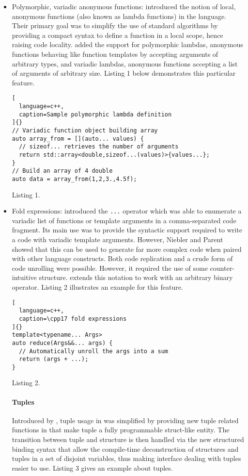 \documentclass[../../main.tex]{subfiles}
\begin{document}
\begin{itemize}
\item Polymorphic, variadic anonymous functions: 
introduced the notion of local, anonymous functions
(also known as lambda functions) in the language.
Their primary goal was to simplify the use of standard
algorithms by providing a compact syntax to define a
function in a local scope, hence raising code locality.
 added the support for polymorphic lambdas, \ie
anonymous functions behaving like function templates
by accepting arguments of arbitrary types, and variadic
lambdas, \ie anonymous functions accepting a list of
arguments of arbitrary size. Listing 1 below demonstrates
this particular feature.

\begin{lstlisting}[
  language=c++,
  caption=Sample polymorphic lambda definition
]{}
// Variadic function object building array
auto array_from = [](auto... values) {
  // sizeof... retrieves the number of arguments
  return std::array<double,sizeof...(values)>{values...};
}
// Build an array of 4 double
auto data = array_from(1,2,3.,4.5f);
\end{lstlisting}
Listing 1.

\item Fold expressions:  introduced the \lstinline{...} operator
which was able to enumerate a variadic list of functions
or template arguments in a comma-separated code
fragment. Its main use was to provide the syntactic
support required to write a code with variadic template
arguments. However, Niebler and Parent showed that
this can be used to generate far more complex code
when paired with other language constructs. Both
code replication and a crude form of code unrolling
were possible. However, it required the use of some
counter-intuitive structure.  extends this notation
to work with an arbitrary binary operator. Listing 2
illustrates an example for this feature.

\begin{lstlisting}[
  language=c++,
  caption=\cpp17 fold expressions
]{}
template<typename... Args>
auto reduce(Args&&... args) {
  // Automatically unroll the args into a sum
  return (args + ...);
}
\end{lstlisting}
Listing 2.

\paragraph{Tuples} Introduced by , tuple usage in \cpp was
simplified by providing new tuple related functions in
 that make tuple a fully programmable struct-like
entity. The transition between tuple and structure is then
handled via the new structured binding syntax that allow
the compile-time deconstruction of structures and tuples
in a set of disjoint variables, thus making interface
dealing with tuples easier to use. Listing 3 gives an
example about tuples.


\end{itemize}
\end{document}
